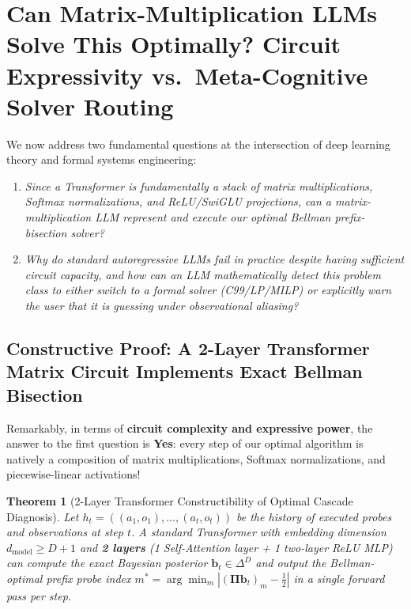 \documentclass[11pt,a4paper]{article}
\newtheorem{theorem}{Theorem}[section]
\theoremstyle{definition}
\theoremstyle{remark}
\begin{document}
\section{Can Matrix-Multiplication LLMs Solve This Optimally? Circuit Expressivity vs.\ Meta-Cognitive Solver Routing}

We now address two fundamental questions at the intersection of deep learning theory and formal systems engineering:
\begin{enumerate}[noitemsep]
    \item \emph{Since a Transformer is fundamentally a stack of matrix multiplications, Softmax normalizations, and ReLU/SwiGLU projections, can a matrix-multiplication LLM represent and execute our optimal Bellman prefix-bisection solver?}
    \item \emph{Why do standard autoregressive LLMs fail in practice despite having sufficient circuit capacity, and how can an LLM mathematically detect this problem class to either switch to a formal solver (C99/LP/MILP) or explicitly warn the user that it is guessing under observational aliasing?}
\end{enumerate}

\subsection{Constructive Proof: A 2-Layer Transformer Matrix Circuit Implements Exact Bellman Bisection}

Remarkably, in terms of \textbf{circuit complexity and expressive power}, the answer to the first question is \textbf{Yes}: every step of our optimal algorithm is natively a composition of matrix multiplications, Softmax normalizations, and piecewise-linear activations!

\begin{theorem}[2-Layer Transformer Constructibility of Optimal Cascade Diagnosis]
Let $h_t = ((a_1, o_1), \dots, (a_t, o_t))$ be the history of executed probes and observations at step $t$. A standard Transformer with embedding dimension $d_{\text{model}} \ge D + 1$ and \textbf{2 layers} (1 Self-Attention layer + 1 two-layer ReLU MLP) can compute the exact Bayesian posterior $\bm{b}_t \in \Delta^D$ and output the Bellman-optimal prefix probe index $m^* = \arg\min_m |(\mathbf{\Pi}\bm{b}_t)_m - \frac{1}{2}|$ in a single forward pass per step.
\end{theorem}
\end{document}
